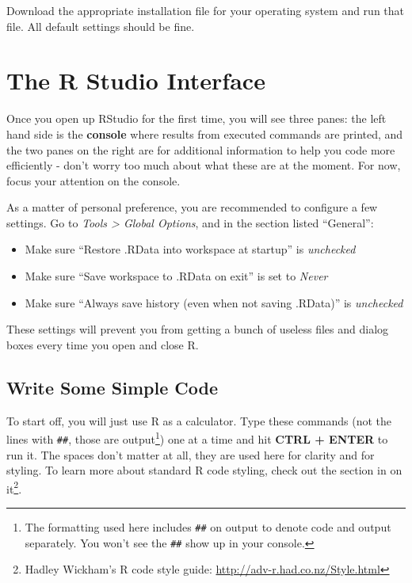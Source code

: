 \documentclass[]{book}
\providecommand{\tightlist}{%
  \setlength{\itemsep}{0pt}\setlength{\parskip}{0pt}}
\let\rmarkdownfootnote\footnote%
\def\footnote{\protect\rmarkdownfootnote}
\theoremstyle{definition}
\theoremstyle{definition}
\theoremstyle{definition}
\theoremstyle{remark}
\begin{document}
Download the appropriate installation file for your operating system and
run that file. All default settings should be fine.

\section{The R Studio Interface}\label{the-r-studio-interface}

Once you open up RStudio for the first time, you will see three panes:
the left hand side is the \textbf{console} where results from executed
commands are printed, and the two panes on the right are for additional
information to help you code more efficiently - don't worry too much
about what these are at the moment. For now, focus your attention on the
console.

As a matter of personal preference, you are recommended to configure a
few settings. Go to \emph{Tools \textgreater{} Global Options}, and in
the section listed ``General'':

\begin{itemize}
\tightlist
\item
  Make sure ``Restore .RData into workspace at startup'' is
  \emph{unchecked}
\item
  Make sure ``Save workspace to .RData on exit'' is set to \emph{Never}
\item
  Make sure ``Always save history (even when not saving .RData)'' is
  \emph{unchecked}
\end{itemize}

These settings will prevent you from getting a bunch of useless files
and dialog boxes every time you open and close R.

\subsection{Write Some Simple Code}\label{write-some-simple-code}

To start off, you will just use R as a calculator. Type these commands
(not the lines with \texttt{\#\#}, those are output\footnote{The
  formatting used here includes \texttt{\#\#} on output to denote code
  and output separately. You won't see the \texttt{\#\#} show up in your
  console.}) one at a time and hit \textbf{CTRL + ENTER} to run it. The
spaces don't matter at all, they are used here for clarity and for
styling. To learn more about standard R code styling, check out the
section in \citet{adv-r-cite} on it\footnote{Hadley Wickham's R code
  style guide: \url{http://adv-r.had.co.nz/Style.html}}.
\end{document}
